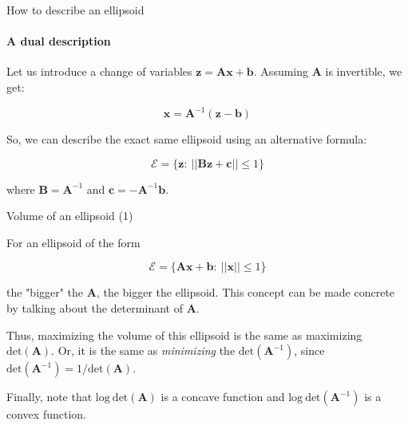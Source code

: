 \documentclass{beamer}
\begin{document}
\begin{frame}{How to describe an ellipsoid}
\framesubtitle{A dual description}
\begin{flushleft}

Let us introduce a change of variables $\mathbf{z} = \mathbf{A}\mathbf{x} + \mathbf{b}$. Assuming $\mathbf{A}$ is invertible, we get:

\begin{equation}
    \mathbf{x} = \mathbf{A}^{-1}(\mathbf{z} - \mathbf{b})
\end{equation}

So, we can describe the exact same ellipsoid using an alternative formula: 

\begin{equation}
    \mathcal{E} = \{ \mathbf{z}: \ || \mathbf{B}\mathbf{z} + \mathbf{c} || \leq 1 \}
\end{equation}
 
 where $\mathbf{B} = \mathbf{A}^{-1}$ and $\mathbf{c} = -\mathbf{A}^{-1}\mathbf{b}$.
 
\end{flushleft}
\end{frame}




\begin{frame}{Volume of an ellipsoid (1)}
\begin{flushleft}

For an ellipsoid of the form

\begin{equation}
    \mathcal{E} = \{ \mathbf{A}\mathbf{x} + \mathbf{b}: \ || \mathbf{x} || \leq 1 \}
\end{equation}

the "bigger" the $\mathbf{A}$, the bigger the ellipsoid. This concept can be made concrete by talking about the determinant of $\mathbf{A}$.

\bigskip

Thus, maximizing the volume of this ellipsoid is the same as maximizing $\text{det}(\mathbf{A})$. Or, it is the same as \emph{minimizing} the $\text{det}(\mathbf{A}^{-1})$, since $\text{det}(\mathbf{A}^{-1}) = 1 / \text{det}(\mathbf{A})$.

\bigskip

Finally, note that $\text{log} \ \text{det}(\mathbf{A})$ is a concave function and $\text{log} \ \text{det}(\mathbf{A}^{-1})$  is a convex function.

 
\end{flushleft}
\end{frame}
\end{document}
